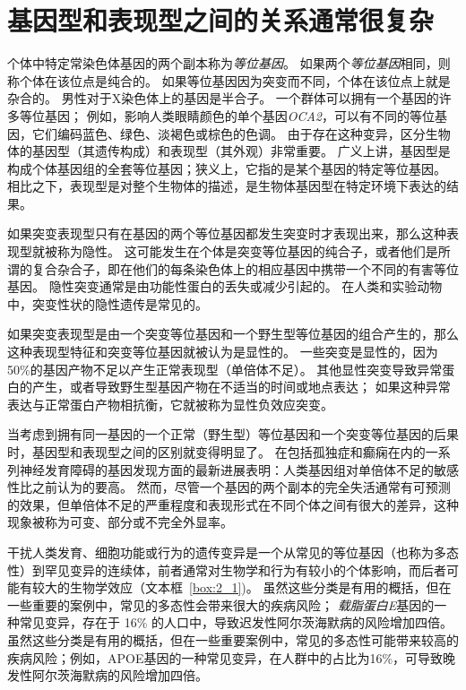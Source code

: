 \section{基因型和表现型之间的关系通常很复杂}

个体中特定常染色体基因的两个副本称为\textit{等位基因}。
如果两个\textit{等位基因}相同，则称个体在该位点是纯合的。
如果等位基因因为突变而不同，个体在该位点上就是杂合的。
男性对于X染色体上的基因是半合子。
一个群体可以拥有一个基因的许多等位基因；
例如，影响人类眼睛颜色的单个基因\textit{OCA2}，可以有不同的等位基因，它们编码蓝色、绿色、淡褐色或棕色的色调。
由于存在这种变异，区分生物体的基因型（其遗传构成）和表现型（其外观）非常重要。
广义上讲，基因型是构成个体基因组的全套等位基因；狭义上，它指的是某个基因的特定等位基因。
相比之下，表现型是对整个生物体的描述，是生物体基因型在特定环境下表达的结果。


如果突变表现型只有在基因的两个等位基因都发生突变时才表现出来，那么这种表现型就被称为隐性。
这可能发生在个体是突变等位基因的纯合子，或者他们是所谓的复合杂合子，即在他们的每条染色体上的相应基因中携带一个不同的有害等位基因。
隐性突变通常是由功能性蛋白的丢失或减少引起的。
在人类和实验动物中，突变性状的隐性遗传是常见的。


如果突变表现型是由一个突变等位基因和一个野生型等位基因的组合产生的，那么这种表现型特征和突变等位基因就被认为是显性的。
一些突变是显性的，因为50\%的基因产物不足以产生正常表现型（单倍体不足）。
其他显性突变导致异常蛋白的产生，或者导致野生型基因产物在不适当的时间或地点表达；
如果这种异常表达与正常蛋白产物相抗衡，它就被称为显性负效应突变。



当考虑到拥有同一基因的一个正常（野生型）等位基因和一个突变等位基因的后果时，基因型和表现型之间的区别就变得明显了。
在包括孤独症和癫痫在内的一系列神经发育障碍的基因发现方面的最新进展表明：人类基因组对单倍体不足的敏感性比之前认为的要高。
然而，尽管一个基因的两个副本的完全失活通常有可预测的效果，但单倍体不足的严重程度和表现形式在不同个体之间有很大的差异，这种现象被称为可变、部分或不完全外显率。



干扰人类发育、细胞功能或行为的遗传变异是一个从常见的等位基因（也称为多态性）到罕见变异的连续体，前者通常对生物学和行为有较小的个体影响，而后者可能有较大的生物学效应（文本框~\ref{box:2_1})。
虽然这些分类是有用的概括，但在一些重要的案例中，常见的多态性会带来很大的疾病风险；
\textit{载脂蛋白E}基因的一种常见变异，存在于 16\% 的人口中，导致迟发性阿尔茨海默病的风险增加四倍。
虽然这些分类是有用的概括，但在一些重要案例中，常见的多态性可能带来较高的疾病风险；例如，APOE基因的一种常见变异，在人群中的占比为16\%，可导致晚发性阿尔茨海默病的风险增加四倍。


